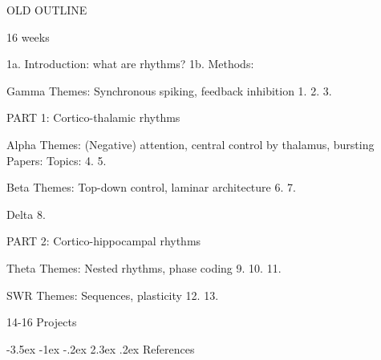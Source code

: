 \documentclass[11pt, reqno]{amsart}
\makeatletter
\numberwithin{figure}{section}
\renewcommand\section{\@startsection {section}{1}{\z@}%
                                   {-3.5ex \@plus -1ex \@minus -.2ex}%
                                   {2.3ex \@plus.2ex}%
                                   {\normalfont\Large\bfseries\scshape}}
\numberwithin{equation}{section}
\makeatother
\begin{document}
OLD OUTLINE


16 weeks

1a. Introduction: what are rhythms?
1b. Methods:

Gamma
Themes: Synchronous spiking, feedback inhibition
1.  
2.
3.

PART 1: Cortico-thalamic rhythms

Alpha
Themes: (Negative) attention, central control by thalamus, bursting
Papers:
Topics:
4. 
5.

Beta
Themes: Top-down control, laminar architecture
6.
7.

Delta
8.

PART 2: Cortico-hippocampal rhythms

Theta
Themes: Nested rhythms, phase coding
9.
10.
11.

SWR
Themes: Sequences, plasticity
12.
13.


14-16 Projects


\section{References}
\printbibliography[heading=none]
\end{document}
